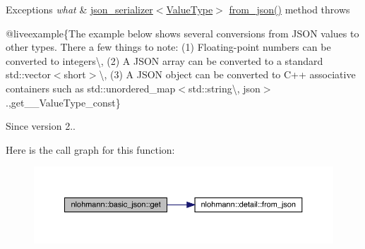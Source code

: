 \begin{DoxyExceptions}{Exceptions}
{\em what} & \mbox{\hyperlink{classnlohmann_1_1basic__json_a7768841baaaa7a21098a401c932efaff}{json\+\_\+serializer$<$\+Value\+Type$>$}} {\ttfamily \mbox{\hyperlink{namespacenlohmann_1_1detail_a839b0ab50d2c9bce669068f56bc41202}{from\+\_\+json()}}} method throws\\
\hline
\end{DoxyExceptions}
@liveexample\{The example below shows several conversions from J\+S\+ON values to other types. There a few things to note\+: (1) Floating-\/point numbers can be converted to integers\textbackslash{}, (2) A J\+S\+ON array can be converted to a standard {\ttfamily std\+::vector$<$short$>$}\textbackslash{}, (3) A J\+S\+ON object can be converted to C++ associative containers such as {\ttfamily std\+::unordered\+\_\+map$<$std\+::string\textbackslash{}, json$>$}.,get\+\_\+\+\_\+\+Value\+Type\+\_\+const\}

\begin{DoxySince}{Since}
version 2.. 
\end{DoxySince}
Here is the call graph for this function\+:
\nopagebreak
\begin{figure}[H]
\begin{center}
\leavevmode
\includegraphics[width=350pt]{classnlohmann_1_1basic__json_aa6602bb24022183ab989439e19345d08_cgraph}
\end{center}
\end{figure}
\mbox{\label{classnlohmann_1_1basic__json_a5afa21d477e13fa7a3dcd7ea66c48b52}} 
